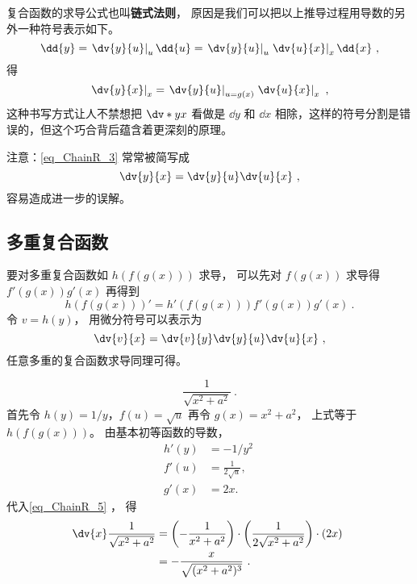 复合函数的求导公式也叫\textbf{链式法则}， 原因是我们可以把以上推导过程用导数的另外一种符号表示如下。
\begin{equation}
\dd{y} = \left.\dv{y}{u}\right|_u \dd{u} = \left.\dv{y}{u}\right|_u \left.\dv{u}{x}\right|_x \dd{x}~,
\end{equation}
得
\begin{equation}\label{eq_ChainR_3}
\left.\dv{y}{x}\right|_{x} = \left.\dv{y}{u}\right|_{u = g(x)} \left.\dv{u}{x}\right|_{x}~,
\end{equation}
这种书写方式让人不禁想把 $\dv*{y}{x}$ 看做是 $\dd{y}$ 和 $\dd{x}$ 相除，这样的符号分割是错误的，但这个巧合背后蕴含着更深刻的原理。

注意：\autoref{eq_ChainR_3} 常常被简写成
\begin{equation}
\dv{y}{x} = \dv{y}{u} \dv{u}{x}~,
\end{equation}
容易造成进一步的误解。

\subsection{多重复合函数}
要对多重复合函数如 $h(f(g(x)))$ 求导， 可以先对 $f(g(x))$ 求导得 $f'(g(x))g'(x)$ 再得到
\begin{equation}
h(f(g(x)))' = h'(f(g(x)))f'(g(x))g'(x)~.
\end{equation}
令 $v = h(y)$， 用微分符号可以表示为
\begin{equation}
\dv{v}{x} = \dv{v}{y}\dv{y}{u}\dv{u}{x}~,
\end{equation}
任意多重的复合函数求导同理可得。

\begin{example}{}
\begin{equation}
\frac{1}{\sqrt{x^2+a^2}}~.
\end{equation}
首先令 $h(y) = 1/y$，$f(u) = \sqrt{u}$ 再令 $g(x) = x^2+a^2$， 上式等于 $h(f(g(x)))$。 由基本初等函数的导数，
\begin{equation}
\begin{aligned}
h'(y) &= - 1/y^2 \\
f'(u) &=  \frac{1}{2 \sqrt{u}}, \\
g'(x) &= 2x.
\end{aligned}~
\end{equation}
代入\autoref{eq_ChainR_5} ， 得
\begin{equation}
\begin{aligned}
\dv{x} \frac{1}{\sqrt{x^2+a^2}} &= \left(- {1 \over x^2 + a^2}\right) \cdot \left( {1 \over 2 \sqrt{x^2 + a^2}} \right) \cdot \left( 2 x \right) \\
&= -\frac{x}{\sqrt{(x^2+a^2)^3}}~.
\end{aligned}~
\end{equation}

\end{example}

